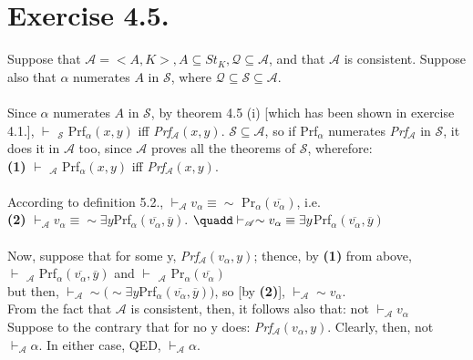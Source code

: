 \documentclass{article}
\begin{document}
\section*{Exercise 4.5.}
Suppose that $\mathscr{A}=<A,K>, A\subseteq St_{K}, \mathscr{Q}\subseteq \mathscr{A}$, and that $\mathscr{A}$ is consistent. Suppose also that $\alpha$ numerates $A$ in $\mathscr{S}$, where $\mathscr{Q}\subseteq\mathscr{S}\subseteq\mathscr{A}$.\\\\
Since $\alpha$ numerates $A$ in $\mathscr{S}$, by theorem 4.5 (i) [which has been shown in exercise 4.1.], $\vdash$ $_{\mathscr{S}}$ Prf$_{\alpha}(x,y)$ iff \textit{Prf}$_{\mathscr{A}}(x,y)$. $\mathscr{S}\subseteq\mathscr{A}$, so if Prf$_{\alpha}$ numerates \textit{Prf}$_{\mathscr{A}}$ in $\mathscr{S}$, it does it in $\mathscr{A}$ too, since ${\mathscr{A}}$ proves all the theorems of $\mathscr{S}$, wherefore:\\
\textbf{(1)} \quadd $\vdash$ $_{\mathscr{A}}$ Prf$_{\alpha}(x,y)$ iff \textit{Prf}$_{\mathscr{A}}(x,y)$.\\\\
According to definition 5.2., $\vdash_{\mathscr{A}} v_{\alpha} \equiv \sim$ Pr$_{\alpha}(\overline{v_{\alpha}})$, i.e.\\
\textbf{(2)} $\vdash_{\mathscr{A}} v_{\alpha} \equiv \sim \exists y$Prf$_{\alpha}(\overline{v_{\alpha}}, \overline{y})$. $\quadd \vdash_{\mathscr{A}} \sim v_{\alpha} \equiv \exists y$Prf$_{\alpha}(\overline{v_{\alpha}}, \overline{y})$\\\\
Now, suppose that for some y, \textit{Prf}$_{\mathscr{A}}(v_{\alpha},y)$; thence, by \textbf{(1)} from above,\\ $\vdash$ $_{\mathscr{A}}$ Prf$_{\alpha}(\overline{v_{\alpha}},\overline{y})$ and $\vdash$ $_{\mathscr{A}}$ Pr$_{\alpha}(\overline{v_{\alpha}})$ \\ but then, $\vdash_{\mathscr{A}} \sim (\sim \exists y$Prf$_{\alpha}(\overline{v_{\alpha}}, \overline{y}))$, so [by \textbf{(2)}], $\vdash_{\mathscr{A}} \sim v_{\alpha}$.\\ From the fact that $\mathscr{A}$ is consistent, then, it follows also that: not $\vdash_{\mathscr{A}} v_{\alpha}$\\Suppose to the contrary that for no y does: \textit{Prf}$_{\mathscr{A}}(v_{\alpha},y)$. Clearly, then, not $\vdash_{\mathscr{A}} \alpha$. In either case, QED, $\vdash_{\mathscr{A}} \alpha$.
\end{document}
